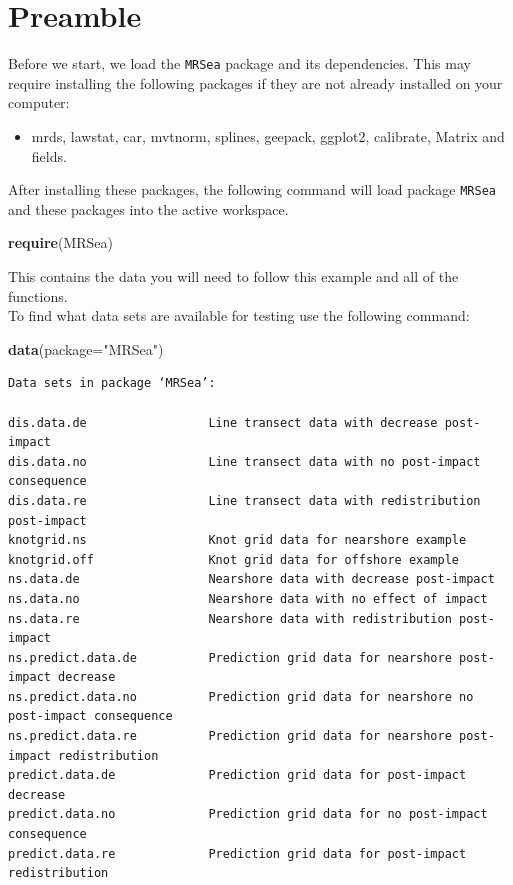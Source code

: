 \documentclass[11pt, a4paper]{article}
\makeatletter
\newcommand{\hlfunctioncall}[1]{\textcolor[rgb]{0.501960784313725,0,0.329411764705882}{\textbf{#1}}}%
\newcommand{\hlstring}[1]{\textcolor[rgb]{0.6,0.6,1}{#1}}%
\newenvironment{kframe}{%
 \def\at@end@of@kframe{}%
 \ifinner\ifhmode%
  \def\at@end@of@kframe{\end{minipage}}%
  \begin{minipage}{\columnwidth}%
 \fi\fi%
 \def\FrameCommand##1{\hskip\@totalleftmargin \hskip-\fboxsep
 \colorbox{shadecolor}{##1}\hskip-\fboxsep
     \hskip-\linewidth \hskip-\@totalleftmargin \hskip\columnwidth}%
 \MakeFramed {\advance\hsize-\width
   \@totalleftmargin\z@ \linewidth\hsize
   \@setminipage}}%
 {\par\unskip\endMakeFramed%
 \at@end@of@kframe}
\newenvironment{knitrout}{}{} %
\makeatother
\begin{document}
\section{Preamble} 
Before we start, we load the {\tt MRSea} package and its dependencies. 
This may require installing the following packages if they are not already installed on your computer: 
\begin{itemize}
\item mrds, lawstat, car, mvtnorm, splines, geepack, ggplot2, calibrate, Matrix and fields.
\end{itemize}
After installing these packages, the following command will load package {\tt MRSea} and these packages into the active workspace. 
\begin{knitrout}\footnotesize
{}\color{fgcolor}
\begin{kframe}
\hlfunctioncall{require}(\hlstring{MRSea})
\end{kframe}
\end{knitrout}
This contains the data you will need to follow this example and all of the functions. \\

To find what data sets are available for testing use the following command:\\
\begin{knitrout}\footnotesize
{}\color{fgcolor}
\begin{kframe}
\hlfunctioncall{data}(package=\hlstring{"MRSea"})
\end{kframe}
\begin{verbatim}
Data sets in package ‘MRSea’:

dis.data.de                 Line transect data with decrease post-impact
dis.data.no                 Line transect data with no post-impact consequence
dis.data.re                 Line transect data with redistribution post-impact
knotgrid.ns                 Knot grid data for nearshore example
knotgrid.off                Knot grid data for offshore example
ns.data.de                  Nearshore data with decrease post-impact
ns.data.no                  Nearshore data with no effect of impact
ns.data.re                  Nearshore data with redistribution post-impact
ns.predict.data.de          Prediction grid data for nearshore post-impact decrease
ns.predict.data.no          Prediction grid data for nearshore no post-impact consequence
ns.predict.data.re          Prediction grid data for nearshore post-impact redistribution
predict.data.de             Prediction grid data for post-impact decrease
predict.data.no             Prediction grid data for no post-impact consequence
predict.data.re             Prediction grid data for post-impact redistribution
\end{verbatim}
\end{knitrout}
\end{document}
